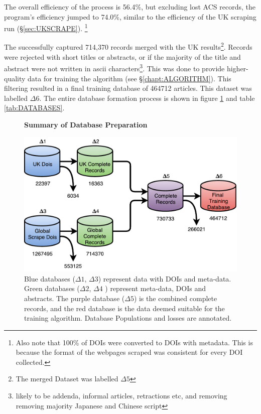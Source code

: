 The overall efficiency of the process is 56.4\%, but excluding lost ACS records, the program's efficiency jumped to 74.0\%, similar to the efficiency of the UK scraping run (\S\ref{sec:UKSCRAPE}). \footnote{Also note that 100\% of DOIs were converted to DOIs with metadata. This is because the format of the webpages scraped was consistent for every DOI collected.}

The successfully captured 714,370 records merged with the UK results\footnote{The merged Dataset was labelled $\Delta5$}. Records were rejected with short titles or abstracts, or if the majority of the title and abstract were not written in ascii characters\footnote{likely to be addenda, informal articles, retractions etc, and removing removing majority Japanese and Chinese script}. This was done to provide higher-quality data for training the algorithm (see \S\ref{chapt:ALGORITHM}). This filtering resulted in a final training database of 464712 articles. This dataset was labelled $\Delta6$. The entire database formation process is shown in figure \ref{fig:DATABASES} and table \ref{tab:DATABASES}.
\begin{figure}[H]
    \centering
    \textbf{Summary of Database Preparation}\par\medskip
    \includegraphics[scale=0.6]{Data_Acquisition/Databases2.pdf}
    \caption[Summary of Database Preparation]{Blue databases ($\Delta1$, $\Delta3$) represent data with DOIs and meta-data. Green databases ($\Delta2$, $\Delta4$ ) represent meta-data, DOIs and abstracts. The purple database ($\Delta5$) is the combined complete records, and the red database is the data deemed suitable for the training algorithm. Database Populations and losses are annotated.}
     \label{fig:DATABASES}
\end{figure}
